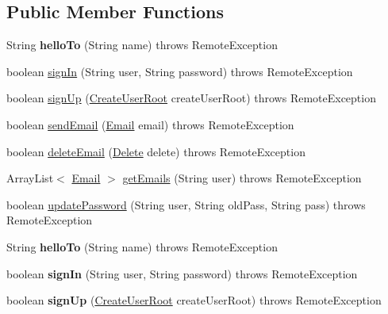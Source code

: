 \subsection*{Public Member Functions}
\begin{DoxyCompactItemize}
\item 
\mbox{\label{interface_r_m_i_interface_a44a3680b28462fce581d362dbc6cf1db}} 
String {\bfseries hello\+To} (String name)  throws Remote\+Exception
\item 
boolean \hyperlink{interface_r_m_i_interface_a826db0ba8f0814985cfa911ef76a68cc}{sign\+In} (String user, String password)  throws Remote\+Exception
\item 
boolean \hyperlink{interface_r_m_i_interface_a39fbf15bb1115837ce6025aaa47784bb}{sign\+Up} (\hyperlink{class_create_user_root}{Create\+User\+Root} create\+User\+Root)  throws Remote\+Exception
\item 
boolean \hyperlink{interface_r_m_i_interface_ad86e01382cdb0cb8a64710a7e9102524}{send\+Email} (\hyperlink{class_email}{Email} email)  throws Remote\+Exception
\item 
boolean \hyperlink{interface_r_m_i_interface_a86bc2a5cb0bdb04a1aeb9b36e373cd5e}{delete\+Email} (\hyperlink{class_delete}{Delete} delete)  throws Remote\+Exception
\item 
Array\+List$<$ \hyperlink{class_email}{Email} $>$ \hyperlink{interface_r_m_i_interface_ad326010c8c132dd3398a4443cf827601}{get\+Emails} (String user)  throws Remote\+Exception
\item 
boolean \hyperlink{interface_r_m_i_interface_a643b5963469fbc121032c7d75c01c7b9}{update\+Password} (String user, String old\+Pass, String pass)  throws Remote\+Exception
\item 
\mbox{\label{interface_r_m_i_interface_a44a3680b28462fce581d362dbc6cf1db}} 
String {\bfseries hello\+To} (String name)  throws Remote\+Exception
\item 
\mbox{\label{interface_r_m_i_interface_a826db0ba8f0814985cfa911ef76a68cc}} 
boolean {\bfseries sign\+In} (String user, String password)  throws Remote\+Exception
\item 
\mbox{\label{interface_r_m_i_interface_a39fbf15bb1115837ce6025aaa47784bb}} 
boolean {\bfseries sign\+Up} (\hyperlink{class_create_user_root}{Create\+User\+Root} create\+User\+Root)  throws Remote\+Exception

\end{DoxyCompactItemize}
